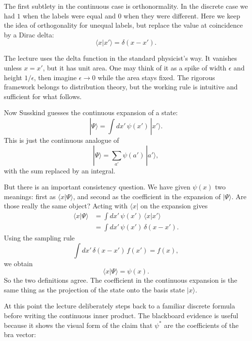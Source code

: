 The first subtlety in the continuous case is orthonormality. In the discrete case we had \(1\) when the labels were equal and \(0\) when they were different. Here we keep the idea of orthogonality for unequal labels, but replace the value at coincidence by a Dirac delta:
\begin{equation}
\langle x|x'\rangle=\delta(x-x').
\end{equation}

The lecture uses the delta function in the standard physicist's way. It vanishes unless \(x=x'\), but it has unit area. One may think of it as a spike of width \(\epsilon\) and height \(1/\epsilon\), then imagine \(\epsilon\to 0\) while the area stays fixed. The rigorous framework belongs to distribution theory, but the working rule is intuitive and sufficient for what follows.

Now Susskind guesses the continuous expansion of a state:
\begin{equation}
|\Psi\rangle=\int dx'\,\psi(x')\,|x'\rangle.
\end{equation}
This is just the continuous analogue of
\begin{equation}
|\Psi\rangle=\sum_{a'}\psi(a')\,|a'\rangle,
\end{equation}
with the sum replaced by an integral.

But there is an important consistency question. We have given \(\psi(x)\) two meanings: first as \(\langle x|\Psi\rangle\), and second as the coefficient in the expansion of \(|\Psi\rangle\). Are those really the same object? Acting with \(\langle x|\) on the expansion gives
\begin{align}
\langle x|\Psi\rangle
&=\int dx'\,\psi(x')\,\langle x|x'\rangle \\
&=\int dx'\,\psi(x')\,\delta(x-x').
\end{align}
Using the sampling rule
\begin{equation}
\int dx'\,\delta(x-x')\,f(x')=f(x),
\end{equation}
we obtain
\begin{equation}
\langle x|\Psi\rangle=\psi(x).
\end{equation}
So the two definitions agree. The coefficient in the continuous expansion is the same thing as the projection of the state onto the basis state \(|x\rangle\).

At this point the lecture deliberately steps back to a familiar discrete formula before writing the continuous inner product. The blackboard evidence is useful because it shows the visual form of the claim that \(\psi^*\) are the coefficients of the bra vector:

